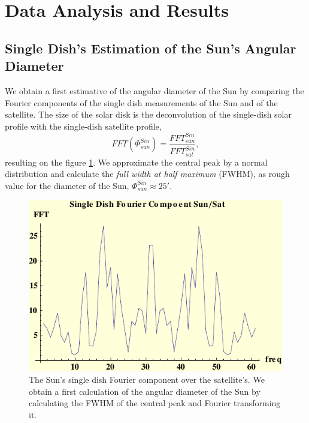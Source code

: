 \section{Data Analysis and Results}



\subsection{Single Dish's Estimation of the Sun's Angular Diameter}

We  obtain a first estimative of the angular diameter of the Sun by comparing the Fourier components of the single dish measurements of the Sun and of the satellite. The size of the solar disk is the deconvolution of the single-dish solar profile with the single-dish satellite profile,
$$FFT(\Phi_{sun}^{Sin}) = \frac{FFT^{Sin}_{sun}}{FFT^{Sin}_{sat}},$$
resulting on the figure \ref{11}. We approximate the  central peak by a normal distribution and calculate the {\it full width at half maximum} (FWHM), as rough value for the  diameter of the Sun, $\Phi^{Sin}_{sun} \approx 25' $.


 \begin{figure}[htb]
\begin{center}
 \includegraphics[scale=1.2]{plots/single.pdf}
\caption{The Sun's single dish Fourier component  over the satellite's. We  obtain a first calculation of the angular diameter of the Sun by calculating the FWHM of the central peak and Fourier transforming it. }
\label{11}
\end{center}
\end{figure}


